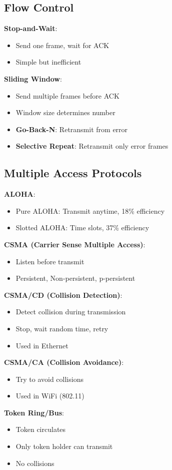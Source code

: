 \documentclass[12pt,a4paper]{report}
\begin{document}
\subsection{Flow Control}
\begin{concept}
\textbf{Stop-and-Wait}:
\begin{itemize}
    \item Send one frame, wait for ACK
    \item Simple but inefficient
\end{itemize}

\textbf{Sliding Window}:
\begin{itemize}
    \item Send multiple frames before ACK
    \item Window size determines number
    \item \textbf{Go-Back-N}: Retransmit from error
    \item \textbf{Selective Repeat}: Retransmit only error frames
\end{itemize}
\end{concept}

\subsection{Multiple Access Protocols}
\begin{concept}
\textbf{ALOHA}:
\begin{itemize}
    \item Pure ALOHA: Transmit anytime, 18\% efficiency
    \item Slotted ALOHA: Time slots, 37\% efficiency
\end{itemize}

\textbf{CSMA (Carrier Sense Multiple Access)}:
\begin{itemize}
    \item Listen before transmit
    \item Persistent, Non-persistent, p-persistent
\end{itemize}

\textbf{CSMA/CD (Collision Detection)}:
\begin{itemize}
    \item Detect collision during transmission
    \item Stop, wait random time, retry
    \item Used in Ethernet
\end{itemize}

\textbf{CSMA/CA (Collision Avoidance)}:
\begin{itemize}
    \item Try to avoid collisions
    \item Used in WiFi (802.11)
\end{itemize}

\textbf{Token Ring/Bus}:
\begin{itemize}
    \item Token circulates
    \item Only token holder can transmit
    \item No collisions
\end{itemize}
\end{concept}
\end{document}
